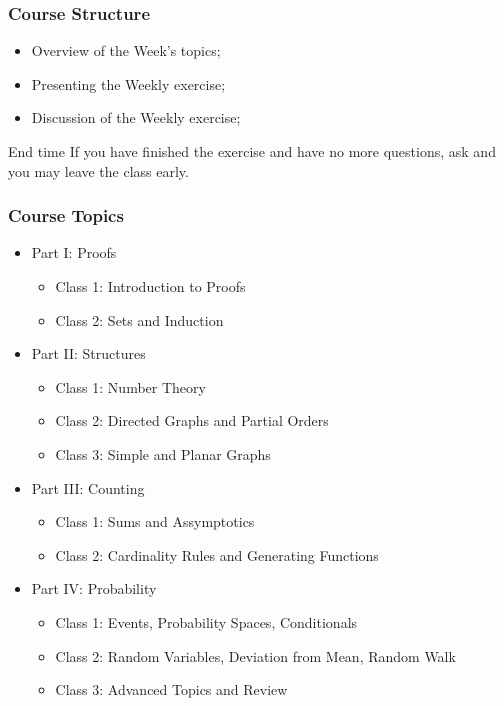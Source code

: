 \documentclass{beamer}
\begin{document}
\begin{frame}
  \frametitle{Course Structure}

  \begin{itemize}
  \item Overview of the Week's topics;
  \item Presenting the Weekly exercise;
  \item Discussion of the Weekly exercise;
  \end{itemize}

  \bigskip
  \begin{block}{End time}
    If you have finished the exercise and have no more questions, ask
    and you may leave the class early.
  \end{block}
\end{frame}

\begin{frame}
  \frametitle{Course Topics}
  \begin{itemize}
  \item Part I: Proofs
    \begin{itemize}
    \item Class 1: Introduction to Proofs
    \item Class 2: Sets and Induction
    \end{itemize}
  \item Part II: Structures
    \begin{itemize}
    \item Class 1: Number Theory
    \item Class 2: Directed Graphs and Partial Orders
    \item Class 3: Simple and Planar Graphs
    \end{itemize}
  \item Part III: Counting
    \begin{itemize}
    \item Class 1: Sums and Assymptotics
    \item Class 2: Cardinality Rules and Generating Functions
    \end{itemize}
  \item Part IV: Probability
    \begin{itemize}
    \item Class 1: Events, Probability Spaces, Conditionals
    \item Class 2: Random Variables, Deviation from Mean, Random Walk
    \item Class 3: Advanced Topics and Review
    \end{itemize}
  \end{itemize}
\end{frame}
\end{document}

